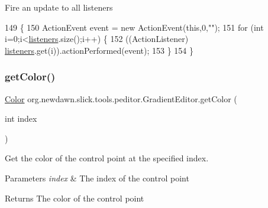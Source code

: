 Fire an update to all listeners 
\begin{DoxyCode}
149                               \{
150         ActionEvent \textcolor{keyword}{event} = \textcolor{keyword}{new} ActionEvent(\textcolor{keyword}{this},0,\textcolor{stringliteral}{""});
151         \textcolor{keywordflow}{for} (\textcolor{keywordtype}{int} i=0;i<\mbox{\hyperlink{classorg_1_1newdawn_1_1slick_1_1tools_1_1peditor_1_1_gradient_editor_a9df94248f3547e312d52a7d3fd3568f5}{listeners}}.size();i++) \{
152             ((ActionListener) \mbox{\hyperlink{classorg_1_1newdawn_1_1slick_1_1tools_1_1peditor_1_1_gradient_editor_a9df94248f3547e312d52a7d3fd3568f5}{listeners}}.get(i)).actionPerformed(event);
153         \}
154     \}
\end{DoxyCode}
\mbox{\label{classorg_1_1newdawn_1_1slick_1_1tools_1_1peditor_1_1_gradient_editor_a98675405a4d61ae603ebd578143d5fb7}} 
\subsubsection{\texorpdfstring{get\+Color()}{getColor()}}
{\footnotesize\ttfamily \mbox{\hyperlink{classorg_1_1newdawn_1_1slick_1_1_color}{Color}} org.\+newdawn.\+slick.\+tools.\+peditor.\+Gradient\+Editor.\+get\+Color (\begin{DoxyParamCaption}\item[{int}]{index }\end{DoxyParamCaption})\hspace{0.3cm}{\ttfamily [inline]}}

Get the color of the control point at the specified index.


\begin{DoxyParams}{Parameters}
{\em index} & The index of the control point \\
\hline
\end{DoxyParams}
\begin{DoxyReturn}{Returns}
The color of the control point 
\end{DoxyReturn}

